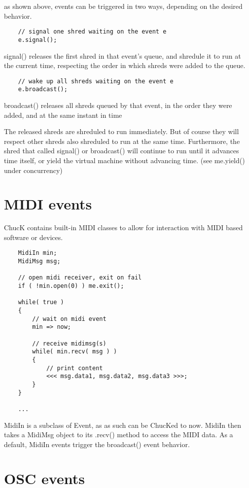 as shown above, events can be triggered in two ways, depending on the desired behavior.
\begin{verbatim}
    // signal one shred waiting on the event e
    e.signal();
\end{verbatim}

signal() releases the  first shred in that event's queue, and shredule it to run at the current time, respecting the order in which shreds were added to the queue.
\begin{verbatim}
    // wake up all shreds waiting on the event e
    e.broadcast();
\end{verbatim}

broadcast() releases  all shreds queued by that event, in the order they were added, and at the same instant in time

The released shreds are shreduled to run immediately. But of course they will respect other shreds also shreduled to run at the same time. Furthermore, the shred that called signal() or broadcast() will continue to run until it advances time itself, or yield the virtual machine without advancing time. (see me.yield() under concurrency)
 

\section{MIDI events}

ChucK contains built-in MIDI classes to allow for interaction with MIDI based software or devices.
\begin{verbatim}
    MidiIn min;
    MidiMsg msg;

    // open midi receiver, exit on fail
    if ( !min.open(0) ) me.exit(); 

    while( true )
    {
        // wait on midi event
        min => now;

        // receive midimsg(s)
        while( min.recv( msg ) )
        {
            // print content
            <<< msg.data1, msg.data2, msg.data3 >>>;
        }
    }

    ...
\end{verbatim}


MidiIn is a subclass of Event, as as such can be ChucKed to now. MidiIn then takes a MidiMsg object to its .recv() method to access the MIDI data.
 As a default, MidiIn events trigger the broadcast() event behavior.
 

\section{OSC events}

